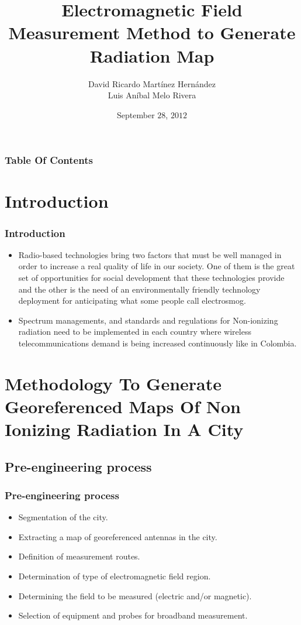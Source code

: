 \documentclass[xcolor=svgnames]{beamer}
\title[Electromagnetic Field Measurement]{Electromagnetic Field Measurement Method to Generate Radiation Map}
\author[David Martínez y Luis Melo]{David Ricardo Martínez Hernández \\ Luis Aníbal Melo Rivera}
\institute[UNAL]{Faculty of Engineer\\ Department of Electric and Electronic \\ National University Of Colombia}
\date[09/28/2012]{September $28$, $2012$}
\begin{document}
\begin{frame}
\titlepage
\end{frame}

\begin{frame}
\frametitle{Table Of Contents}
\tableofcontents
\end{frame}

\section{Introduction}
\begin{frame}
\frametitle{Introduction}
\begin{itemize}
 \item Radio-based technologies bring two factors that must be well managed in order to increase a real quality of life in our society. One of them is the great set of opportunities for social development that these technologies provide and the other is the need of an environmentally friendly technology deployment for anticipating what some people call electrosmog.\pause
 \item Spectrum managements, and standards and regulations for Non-ionizing radiation need to be implemented in each country where wireless telecommunications demand is being increased continuously like in Colombia.
\end{itemize}
\end{frame}

\section[Methodology To Generate Georeferenced Maps]{Methodology To Generate Georeferenced Maps Of Non Ionizing Radiation In A City}
\subsection{Pre-engineering process}
\begin{frame}
\frametitle{Pre-engineering process}
 \begin{itemize}
  \item Segmentation of the city.\pause
  \item Extracting a map of georeferenced antennas in the city.\pause
  \item Definition of measurement routes.\pause
  \item Determination of type of electromagnetic field region.\pause
  \item Determining the field to be measured (electric and/or magnetic).\pause
  \item Selection of equipment and probes for broadband measurement.
 \end{itemize}
\end{frame}
\end{document}

